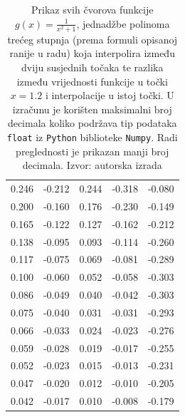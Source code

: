 \documentclass[12pt,a4paper]{report}
\begin{document}
\begin{table}
\begin{center}
\begin{tabular}{c c c c | c}
0.246  & -0.212  & 0.244  & -0.318 & -0.080 \\
0.200  & -0.160  & 0.176  & -0.230 & -0.149 \\
0.165  & -0.122  & 0.127  & -0.162 & -0.212 \\
0.138  & -0.095  & 0.093  & -0.114 & -0.260 \\
0.117  & -0.075  & 0.069  & -0.081 & -0.289 \\
0.100  & -0.060  & 0.052  & -0.058 & -0.303 \\
0.086  & -0.049  & 0.040  & -0.042 & -0.303 \\
0.075  & -0.040  & 0.031  & -0.031 & -0.293 \\
0.066  & -0.033  & 0.024  & -0.023 & -0.276 \\
0.059  & -0.028  & 0.019  & -0.017 & -0.255 \\
0.052  & -0.023  & 0.015  & -0.013 & -0.231 \\
0.047  & -0.020  & 0.012  & -0.010 & -0.205 \\
0.042  & -0.017  & 0.010  & -0.008 & -0.179 \\


			
		\end{tabular}
	\end{center}
	\caption{
		Prikaz svih čvorova funkcije $g(x)=\frac{1}{x^2 +1}$, jednadžbe polinoma trećeg stupnja (prema formuli opisanoj ranije u radu) koja interpolira između dviju susjednih točaka te razlika između vrijednosti funkcije u točki $x=1.2$ i interpolacije u istoj točki. U izračunu je korišten maksimalni broj decimala koliko podržava tip podataka \texttt{float} iz \texttt{Python} biblioteke \texttt{Numpy}. Radi preglednosti je prikazan manji broj decimala. Izvor: autorska izrada}
	\label{kubInterpolTablicaDrugi}
\end{table}
{}

\end{document}
